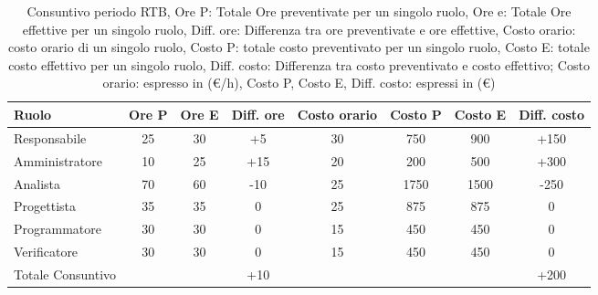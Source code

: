 \begin{table}[H]
	\centering
	\begin{tabular}{l|c|c|c|c|c|c|c}
		\textbf{Ruolo}         & \textbf{Ore P} & \textbf{Ore E} & \textbf{Diff. ore} & \textbf{Costo orario} & \textbf{Costo P} &\textbf{Costo E} & \textbf{Diff. costo}  \\
		\hline
		Responsabile            & 25                     & 30             & +5                    & 30                   & 750           & 900                     & +150              \\
		Amministratore          & 10                     & 25             & +15                   & 20                   & 200           & 500                     & +300              \\
		Analista                & 70                     & 60             & -10                   & 25                   & 1750           & 1500                   & -250              \\
		Progettista             & 35                     & 35             & 0                     & 25                   & 875           & 875                     & 0              \\
		Programmatore           & 30                     & 30             & 0                     & 15                   & 450           & 450                     & 0              \\
		Verificatore            & 30                     & 30             & 0                     & 15                   & 450           & 450                     & 0              \\
        \hline
        Totale Consuntivo       &                        &                & +10                   &                      &               &                         & +200              \\
		\hline
	\end{tabular}
	\caption{Consuntivo periodo RTB, Ore P: Totale Ore preventivate per un singolo ruolo, Ore e: Totale Ore effettive per un singolo ruolo, 
            Diff. ore: Differenza tra ore preventivate e ore effettive, Costo orario: costo orario di un singolo ruolo, Costo P: totale costo preventivato per un singolo ruolo, 
            Costo E: totale costo effettivo per un singolo ruolo,  Diff. costo: Differenza tra costo preventivato e costo effettivo;
            Costo orario: espresso in (\euro/h), Costo P, Costo E, Diff. costo: espressi in (\euro)}  
\end{table}


